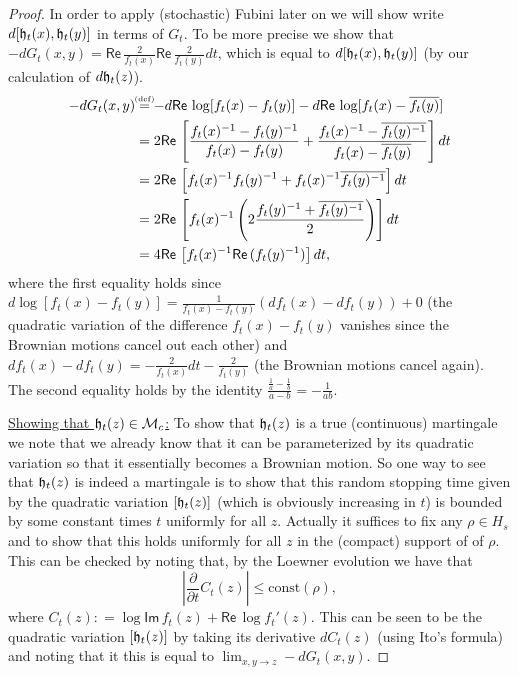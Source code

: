 \documentclass[11pt,reqno]{amsart}
\numberwithin{equation}{section}
\newcommand{\eqbydef}{\mathrel{\stackrel{\hspace*{-3mm}\text{\tiny(def)}\hspace*{-3mm}}{=}}}
\newcommand{\deq}{\mathrel{\mathop:}=}
\renewcommand{\Re}{\mathsf{Re}\,}
\renewcommand{\Im}{\mathsf{Im}\,}
\newcommand{\fh}{{\frak h}}
\begin{document}
\begin{proof}
	In order to apply (stochastic) Fubini later on we will show write $d[\fh_t(x),\fh_t(y)]$ in terms of $G_t$. To be more precise we show that $-dG_t(x,y)=\Re\frac{2}{f_t(x)}\Re\frac{2}{f_t(y)}dt$, which is equal to $d[\fh_t(x),\fh_t(y)]$ (by our calculation of $d\fh_t(z)$).
	\begin{align*}
		-dG_t(x,y)&\eqbydef -d\Re\log[f_t(x)-f_t(y)]-d\Re\log[f_t(x)-\overline{f_t(y)}]\\
		&=2\Re\left[\frac{f_t(x)^{-1}-f_t(y)^{-1}}{f_t(x)-f_t(y)}+\frac{f_t(x)^{-1}-\overline{f_t(y)^{-1}}}{f_t(x)-\overline{f_t(y)}}\right]dt\\
		&=2\Re\left[f_t(x)^{-1}f_t(y)^{-1}+f_t(x)^{-1}\overline{f_t(y)^{-1}}\right]dt\\
		&=2\Re\left[f_t(x)^{-1}\left(2\frac{f_t(y)^{-1}+\overline{f_t(y)^{-1}}}{2}\right)\right]dt\\
		&=4\Re\left[f_t(x)^{-1}\Re(f_t(y)^{-1})\right]dt,
	\end{align*}
	where the first equality holds since $d\log[f_t(x)-f_t(y)]=\frac{1}{f_t(x)-f_t(y)}(df_t(x)-df_t(y))+0$ (the quadratic variation of the difference $f_t(x)-f_t(y)$ vanishes since the Brownian motions cancel out each other) and $df_t(x)-df_t(y)=-\frac{2}{f_t(x)}dt-\frac{2}{f_t(y)}$ (the Brownian motions cancel again). The second equality holds by the identity $\frac{\frac{1}{a}-\frac{1}{b}}{a-b}=-\frac{1}{ab}$.
	
	\underline{Showing that $\fh_t(z)\in\mathcal M_c$:} To show that $\fh_t(z)$ is a true (continuous) martingale we note that we already know that it can be parameterized by its quadratic variation so that it essentially becomes a Brownian motion. So one way to see that $\fh_t(z)$ is indeed a martingale is to show that this random stopping time given by the quadratic variation $[\fh_t(z)]$ (which is obviously increasing in $t$) is bounded by some constant times $t$ uniformly for all $z$. Actually it suffices to fix any $\rho\in H_s$ and to show that this holds uniformly for all $z$ in the (compact) support of of $\rho$. This can be checked by noting that, by the Loewner evolution we have that $$|\frac{\partial}{\partial t} C_t(z)|\leq \text{const}(\rho),$$ where $C_t(z)\deq \log\Im f_t(z)+\Re\log f_t'(z)$. This can be seen to be the quadratic variation $[\fh_t(z)]$ by taking its derivative $dC_t(z)$ (using Ito's formula) and noting that it this is equal to $\lim_{x,y\rightarrow z} -dG_t(x,y)$.
	

\end{proof}
\end{document}
